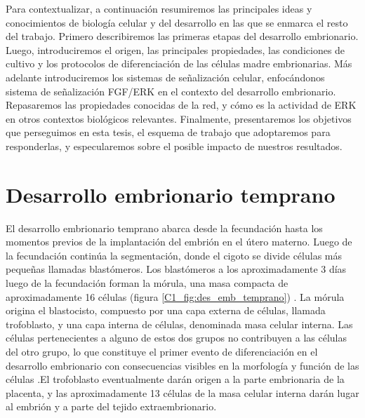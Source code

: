 \documentclass[./main.tex]{subfiles}
\begin{document}


Para contextualizar, a continuación resumiremos las principales ideas y conocimientos de biología celular y del desarrollo en las que se enmarca el resto del trabajo. Primero describiremos las primeras etapas del desarrollo embrionario. Luego, introduciremos el origen, las principales propiedades, las condiciones de cultivo y los protocolos de diferenciación de las células madre embrionarias. Más adelante introduciremos los sistemas de señalización celular, enfocándonos sistema de señalización FGF/ERK en el contexto del desarrollo embrionario. Repasaremos las propiedades conocidas de la red, y cómo es la actividad de ERK en otros contextos biológicos relevantes. Finalmente, presentaremos los objetivos que perseguimos en esta tesis, el esquema de trabajo que adoptaremos para responderlas, y especularemos sobre el posible impacto de nuestros resultados.



\section{Desarrollo embrionario temprano}
\label{C1_sec:desarrollo_embrionario_temprano}

El desarrollo embrionario temprano abarca desde la fecundación hasta los momentos previos de la implantación del embrión en el útero materno. Luego de la fecundación continúa la segmentación, donde el cigoto se divide células más pequeñas llamadas blastómeros. Los blastómeros a los aproximadamente 3 días luego de la fecundación forman la mórula, una masa compacta de aproximadamente 16 células (figura \ref{C1_fig:des_emb_temprano}) \cite{Gilbert2006}. La mórula origina el blastocisto, compuesto por una capa externa de células, llamada trofoblasto, y una capa interna de células, denominada masa celular interna. Las células pertenecientes a alguno de estos dos grupos no contribuyen a las células del otro grupo, lo que constituye el primer evento de diferenciación en el desarrollo embrionario con consecuencias visibles en la morfología y función de las células  \cite{Dyce1987,Fleming1987}.El trofoblasto eventualmente darán origen a la parte embrionaria de la placenta, y las aproximadamente 13 células de la masa celular interna darán lugar al embrión y a parte del tejido extraembrionario.  
\end{document}
